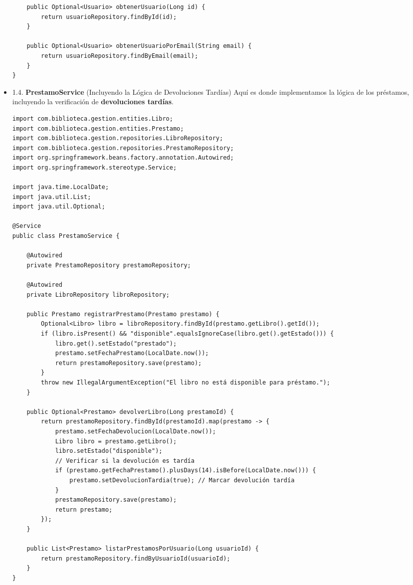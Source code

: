 \documentclass[11pt]{article}
\begin{document}
\begin{itemize}
\begin{verbatim}
    public Optional<Usuario> obtenerUsuario(Long id) {
        return usuarioRepository.findById(id);
    }

    public Optional<Usuario> obtenerUsuarioPorEmail(String email) {
        return usuarioRepository.findByEmail(email);
    }
}
\end{verbatim}

\item 1.4. \textbf{PrestamoService} (Incluyendo la Lógica de Devoluciones Tardías)
\label{sec:org2055122}
Aquí es donde implementamos la lógica de los préstamos, incluyendo la
verificación de \textbf{devoluciones tardías}.

\begin{verbatim}
import com.biblioteca.gestion.entities.Libro;
import com.biblioteca.gestion.entities.Prestamo;
import com.biblioteca.gestion.repositories.LibroRepository;
import com.biblioteca.gestion.repositories.PrestamoRepository;
import org.springframework.beans.factory.annotation.Autowired;
import org.springframework.stereotype.Service;

import java.time.LocalDate;
import java.util.List;
import java.util.Optional;

@Service
public class PrestamoService {

    @Autowired
    private PrestamoRepository prestamoRepository;

    @Autowired
    private LibroRepository libroRepository;

    public Prestamo registrarPrestamo(Prestamo prestamo) {
        Optional<Libro> libro = libroRepository.findById(prestamo.getLibro().getId());
        if (libro.isPresent() && "disponible".equalsIgnoreCase(libro.get().getEstado())) {
            libro.get().setEstado("prestado");
            prestamo.setFechaPrestamo(LocalDate.now());
            return prestamoRepository.save(prestamo);
        }
        throw new IllegalArgumentException("El libro no está disponible para préstamo.");
    }

    public Optional<Prestamo> devolverLibro(Long prestamoId) {
        return prestamoRepository.findById(prestamoId).map(prestamo -> {
            prestamo.setFechaDevolucion(LocalDate.now());
            Libro libro = prestamo.getLibro();
            libro.setEstado("disponible");
            // Verificar si la devolución es tardía
            if (prestamo.getFechaPrestamo().plusDays(14).isBefore(LocalDate.now())) {
                prestamo.setDevolucionTardia(true); // Marcar devolución tardía
            }
            prestamoRepository.save(prestamo);
            return prestamo;
        });
    }

    public List<Prestamo> listarPrestamosPorUsuario(Long usuarioId) {
        return prestamoRepository.findByUsuarioId(usuarioId);
    }
}
\end{verbatim}
\end{itemize}
\end{document}
